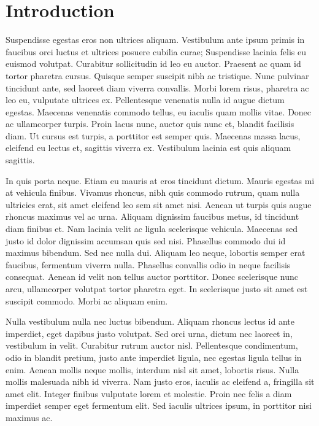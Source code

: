 \chapter{Introduction}

Suspendisse egestas eros non ultrices aliquam. Vestibulum ante ipsum primis in faucibus orci luctus et ultrices posuere cubilia curae; Suspendisse lacinia felis eu euismod volutpat. Curabitur sollicitudin id leo eu auctor. Praesent ac quam id tortor pharetra cursus. Quisque semper suscipit nibh ac tristique. Nunc pulvinar tincidunt ante, sed laoreet diam viverra convallis. Morbi lorem risus, pharetra ac leo eu, vulputate ultrices ex. Pellentesque venenatis nulla id augue dictum egestas. Maecenas venenatis commodo tellus, eu iaculis quam mollis vitae. Donec ac ullamcorper turpis. Proin lacus nunc, auctor quis nunc et, blandit facilisis diam. Ut cursus est turpis, a porttitor est semper quis. Maecenas massa lacus, eleifend eu lectus et, sagittis viverra ex. Vestibulum lacinia est quis aliquam sagittis.

In quis porta neque. Etiam eu mauris at eros tincidunt dictum. Mauris egestas mi at vehicula finibus. Vivamus rhoncus, nibh quis commodo rutrum, quam nulla ultricies erat, sit amet eleifend leo sem sit amet nisi. Aenean ut turpis quis augue rhoncus maximus vel ac urna. Aliquam dignissim faucibus metus, id tincidunt diam finibus et. Nam lacinia velit ac ligula scelerisque vehicula. Maecenas sed justo id dolor dignissim accumsan quis sed nisi. Phasellus commodo dui id maximus bibendum. Sed nec nulla dui. Aliquam leo neque, lobortis semper erat faucibus, fermentum viverra nulla. Phasellus convallis odio in neque facilisis consequat. Aenean id velit non tellus auctor porttitor. Donec scelerisque nunc arcu, ullamcorper volutpat tortor pharetra eget. In scelerisque justo sit amet est suscipit commodo. Morbi ac aliquam enim.

Nulla vestibulum nulla nec luctus bibendum. Aliquam rhoncus lectus id ante imperdiet, eget dapibus justo volutpat. Sed orci urna, dictum nec laoreet in, vestibulum in velit. Curabitur rutrum auctor nisl. Pellentesque condimentum, odio in blandit pretium, justo ante imperdiet ligula, nec egestas ligula tellus in enim. Aenean mollis neque mollis, interdum nisl sit amet, lobortis risus. Nulla mollis malesuada nibh id viverra. Nam justo eros, iaculis ac eleifend a, fringilla sit amet elit. Integer finibus vulputate lorem et molestie. Proin nec felis a diam imperdiet semper eget fermentum elit. Sed iaculis ultrices ipsum, in porttitor nisi maximus ac.

